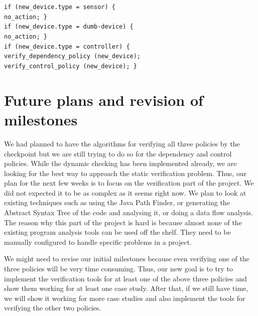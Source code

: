 \documentclass{article}
\begin{document}
\noindent \texttt{if (new\_device.type = sensor) \{ \\ \hspace*{1cm} no\_action; \} \\
if (new\_device.type = dumb-device) \{ \\ \hspace*{1cm} no\_action; \} \\
if (new\_device.type = controller) \{ \\ \hspace*{1cm} verify\_dependency\_policy (new\_device); \\ \hspace*{1.0cm} verify\_control\_policy (new\_device); \}}\\ 

\section{Future plans and revision of milestones}
We had planned to have the algorithms for verifying all three policies by the checkpoint but we are still trying to do so for the dependency and control policies. While the dynamic checking has been implemented already, we are looking for the best way to approach the static verification problem. Thus, our plan for the next few weeks is to focus on the verification part of the project. We did not expected it to be as complex as it seems right now. We plan to look at existing techniques such as using the Java Path Finder, or generating the Abstract Syntax Tree of the code and analysing it, or doing a data flow analysis. The reason why this part of the project is hard is because almost none of the existing program analysis tools can be used off the shelf. They need to be manually configured to handle specific problems in a project. 

We might need to revise our initial milestones because even verifying one of the three policies will be very time consuming.  Thus, our new goal is to try to implement the verification tools for at least one of the above three policies and show them working for at least one case study. After that, if we still have time, we will show it working for more case studies and also implement the tools for verifying the other two policies.
\end{document}
